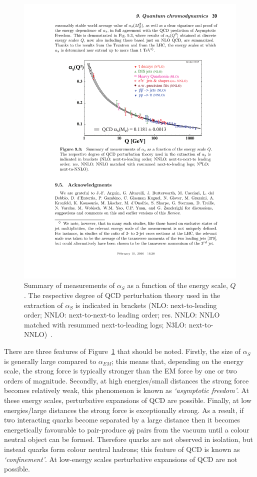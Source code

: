 \begin{figure}[!hbt]
  \begin{center}
    \includegraphics[width=0.7\linewidth, angle=0]{figs/Theory/qcd_running.pdf}
  \end{center}
  \caption[Summary of measurements of $\alpha_S$ as a function of the energy scale, $Q$.]
          {Summary of measurements of $\alpha_S$ as a function of the energy scale, $Q$.
            The respective degree of QCD perturbation theory used in the extraction of $\alpha_S$ is indicated in brackets
            (NLO: next-to-leading order; NNLO: next-to-next-to leading order; res. NNLO: NNLO matched with resummed next-to-leading logs; N3LO: next-to-NNLO)~\cite{theo-qcd}.}
  \label{fig:theo-qcd_running}
\end{figure}

There are three features of Figure~\ref{fig:theo-qcd_running} that should be noted.
Firstly, the size of $\alpha_S$ is generally large compared to $\alpha_{EM}$;
this means that, depending on the energy scale, the strong force is typically stronger than the EM force by one or two orders of magnitude.
Secondly, at high energies/small distances the strong force becomes relatively weak, this phenomenon is known as
\textit{`asymptotic freedom'}.
At these energy scales, perturbative expansions of QCD are possible.
Finally, at low energies/large distances the strong force is exceptionally strong.
As a result, if two interacting quarks become separated by a large distance then it becomes energetically favourable to
pair-produce $q\bar{q}$ pairs from the vacuum until a colour neutral object can be formed.
Therefore quarks are not observed in isolation, but instead quarks form colour neutral hadrons; this feature of QCD is known as \textit{`confinement'}.
At low-energy scales perturbative expansions of QCD are not possible.

